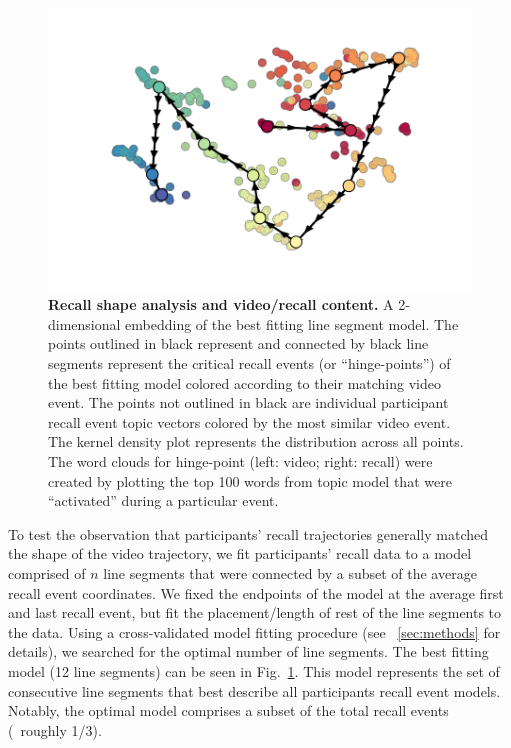 \documentclass{article}
\begin{document}
{\begin{figure}[th!]
\centering
\includegraphics[width=1\textwidth]{figs/5_linesegs.pdf}
\caption{\small \textbf{Recall shape analysis and video/recall content.} A 2-dimensional embedding of the best fitting line segment model.  The points outlined in black represent and connected by black line segments represent the critical recall events (or ``hinge-points'') of the best fitting model colored according to their matching video event.  The points not outlined in black are individual participant recall event topic vectors colored by the most similar video event. The kernel density plot represents the distribution across all points.  The word clouds for hinge-point (left: video; right: recall) were created by plotting the top 100 words from topic model that were ``activated'' during a particular event.}
\label{fig:linesegs}
\end{figure}

To test the observation that participants' recall trajectories generally matched the shape of the video trajectory, we fit participants' recall data to a model comprised of $n$ line segments that were connected by a subset of the average recall event coordinates. We fixed the endpoints of the model at the average first and last recall event, but fit the placement/length of rest of the line segments to the data. Using a cross-validated model fitting procedure (see ~\ref{sec:methods} for details), we searched for the optimal number of line segments. The best fitting model (12 line segments) can be seen in Fig.~\ref{fig:linesegs}. This model represents the set of consecutive line segments that best describe all participants recall event models. Notably, the optimal model comprises a subset of the total recall events (~roughly 1/3). %

}
\end{document}
